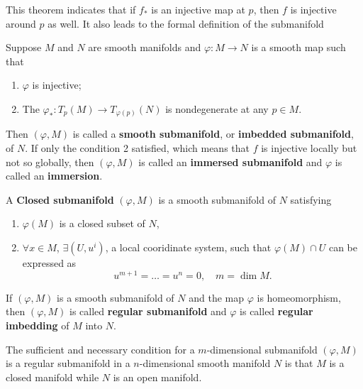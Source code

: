 This theorem indicates that if $f_*$ is an injective map at $p$, then $f$ is injective around $p$ as well. It also leads to the formal definition of the submanifold
\begin{definition}
Suppose $M$ and $N$ are smooth manifolds and $\varphi:M\to N$ is a smooth map such that
\begin{enumerate}
\item $\varphi$ is injective;
\item The $\varphi_*:T_p(M)\to T_{\varphi(p)}(N)$ is nondegenerate at any $p\in M$.
\end{enumerate}
Then $(\varphi, M)$ is called a \textbf{smooth submanifold}, or \textbf{imbedded submanifold}, of $N$.
If only the condition 2 satisfied, which means that $f$ is injective locally but not so globally, then $(\varphi, M)$ is called an \textbf{immersed submanifold} and $\varphi$ is called an \textbf{immersion}.

A \textbf{Closed submanifold} $(\varphi, M)$ is a smooth submanifold of $N$ satisfying
\begin{enumerate}
\item $\varphi(M)$ is a closed subset of $N$,
\item $\forall x\in M$, $\exists (U, u^i)$, a local cooridinate system, such that $\varphi(M)\cap U$ can be expressed as
\begin{equation}
u^{m+1}=\dots=u^{n}=0, \quad m=\dim M.
\end{equation}  
\end{enumerate}

If $(\varphi,M)$ is a smooth submanifold of $N$ and the map $\varphi$ is homeomorphism, then $(\varphi,M)$ is called \textbf{regular submanifold} and $\varphi$ is called \textbf{regular imbedding} of $M$ into $N$. 
\end{definition}


\begin{theorem}
The sufficient and necessary condition for a $m$-dimensional submanifold $(\varphi, M)$ is a regular submanifold in a $n$-dimensional smooth manifold $N$ is that $M$ is a closed manifold while $N$ is an open manifold.
\end{theorem}

